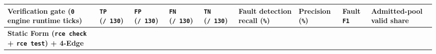 \documentclass[10pt,letterpaper]{article}
\begin{document}
{\scriptsize\setlength{\tabcolsep}{2.4pt}\renewcommand{\arraystretch}{1.12}
\begin{longtable}[]{@{}
  >{\raggedright\arraybackslash}p{}
  >{\raggedleft\arraybackslash}p{}
  >{\raggedleft\arraybackslash}p{}
  >{\raggedleft\arraybackslash}p{}
  >{\raggedleft\arraybackslash}p{}
  >{\raggedleft\arraybackslash}p{}
  >{\raggedleft\arraybackslash}p{}
  >{\raggedleft\arraybackslash}p{}
  >{\raggedleft\arraybackslash}p{}@{}}
\toprule\noalign{}
\begin{minipage}[b]{\linewidth}\raggedright
\textbf{Verification gate (\texttt{0} engine runtime ticks)}
\end{minipage} & \begin{minipage}[b]{\linewidth}\raggedleft
\textbf{\texttt{TP} (\texttt{/\ 130})}
\end{minipage} & \begin{minipage}[b]{\linewidth}\raggedleft
\textbf{\texttt{FP} (\texttt{/\ 130})}
\end{minipage} & \begin{minipage}[b]{\linewidth}\raggedleft
\textbf{\texttt{FN} (\texttt{/\ 130})}
\end{minipage} & \begin{minipage}[b]{\linewidth}\raggedleft
\textbf{\texttt{TN} (\texttt{/\ 130})}
\end{minipage} & \begin{minipage}[b]{\linewidth}\raggedleft
\textbf{Fault detection recall (\texttt{\%})}
\end{minipage} & \begin{minipage}[b]{\linewidth}\raggedleft
\textbf{Precision (\texttt{\%})}
\end{minipage} & \begin{minipage}[b]{\linewidth}\raggedleft
\textbf{Fault \texttt{F1}}
\end{minipage} & \begin{minipage}[b]{\linewidth}\raggedleft
\textbf{Admitted-pool valid share}
\end{minipage} \\
\midrule\noalign{}
\endhead
\bottomrule\noalign{}
\endlastfoot
\textbf{Static Form (\texttt{rce\ check} + \texttt{rce\ test}) + 4-Edge
}
\end{longtable}}
\end{document}
